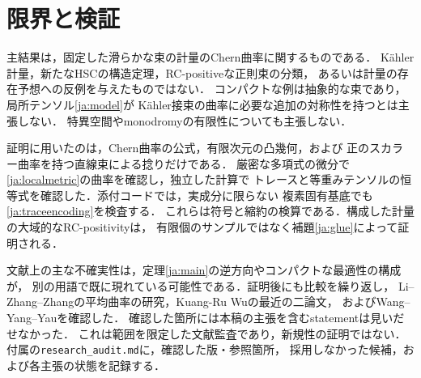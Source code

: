 \documentclass[12pt]{amsart}
\theoremstyle{definition}
\theoremstyle{remark}
\numberwithin{equation}{section}
\theoremstyle{definition}
\begin{document}
\section{限界と検証}
\label{ja:limitations}

主結果は，固定した滑らかな束の計量のChern曲率に関するものである．
K\"ahler計量，新たなHSCの構造定理，RC-positiveな正則束の分類，
あるいは計量の存在予想への反例を与えたものではない．
コンパクトな例は抽象的な束であり，局所テンソル\eqref{ja:model}が
K\"ahler接束の曲率に必要な追加の対称性を持つとは主張しない．
特異空間やmonodromyの有限性についても主張しない．

証明に用いたのは，Chern曲率の公式，有限次元の凸幾何，および
正のスカラー曲率を持つ直線束による捻りだけである．
厳密な多項式の微分で\eqref{ja:localmetric}の曲率を確認し，独立した計算で
トレースと等重みテンソルの恒等式を確認した．添付コードでは，実成分に限らない
複素固有基底でも\eqref{ja:traceencoding}を検査する．
これらは符号と縮約の検算である．構成した計量の大域的なRC-positivityは，
有限個のサンプルではなく補題\ref{ja:glue}によって証明される．

文献上の主な不確実性は，定理\ref{ja:main}の逆方向やコンパクトな最適性の構成が，
別の用語で既に現れている可能性である．証明後にも比較を繰り返し，
Li--Zhang--Zhangの平均曲率の研究，Kuang-Ru Wuの最近の二論文，
およびWang--Yang--Yau\cite{ja:WYY}を確認した．
確認した箇所には本稿の主張を含むstatementは見いだせなかった．
これは範囲を限定した文献監査であり，新規性の証明ではない．
付属の\texttt{research\_audit.md}に，確認した版・参照箇所，
採用しなかった候補，および各主張の状態を記録する．
\end{document}

